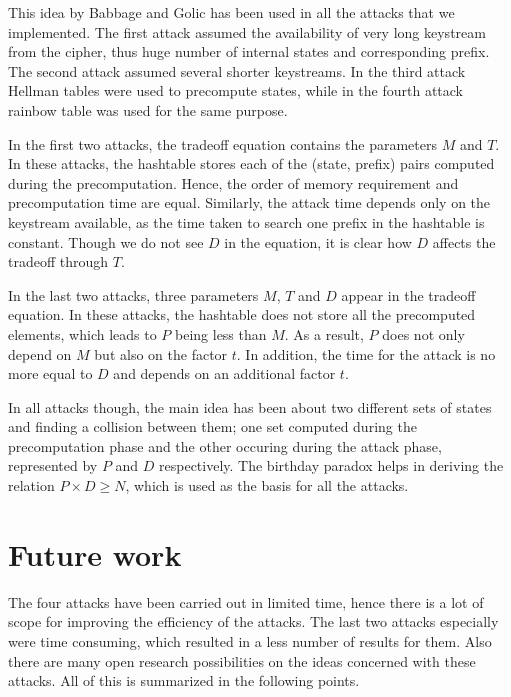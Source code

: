 This idea by Babbage and Golic has been used in all the attacks that we implemented. The first attack assumed the availability of very long keystream from the cipher, thus huge number of internal states and corresponding prefix. The second attack assumed several shorter keystreams. In the third attack Hellman tables were used to precompute states, while in the fourth attack rainbow table was used for the same purpose. 

In the first two attacks, the tradeoff equation contains the parameters $M$ and $T$. In these attacks, the hashtable stores each of the (state, prefix) pairs computed during the precomputation. Hence, the order of memory requirement and precomputation time are equal. Similarly, the attack time depends only on the keystream available, as the time taken to search one prefix in the hashtable is constant. Though we do not see $D$ in the equation, it is clear how $D$ affects the tradeoff through $T$.

In the last two attacks, three parameters $M$, $T$ and $D$ appear in the tradeoff equation. In these attacks, the hashtable does not store all the precomputed elements, which leads to $P$ being less than $M$. As a result, $P$ does not only depend on $M$ but also on the factor $t$. In addition, the time for the attack is no more equal to $D$ and depends on an additional factor $t$. 

In all attacks though, the main idea has been about two different sets of states and finding a collision between them; one set computed during the precomputation phase and the other occuring during the attack phase, represented by $P$ and $D$ respectively. The birthday paradox helps in deriving the relation $P \times D \geq N$, which is used as the basis for all the attacks. 



\section{Future work}

The four attacks have been carried out in limited time, hence there is a lot of scope for improving the efficiency of the attacks. The last two attacks especially were time consuming, which resulted in a less number of results for them. Also there are many open research possibilities on the ideas concerned with these attacks. All of this is summarized in the following points. 

